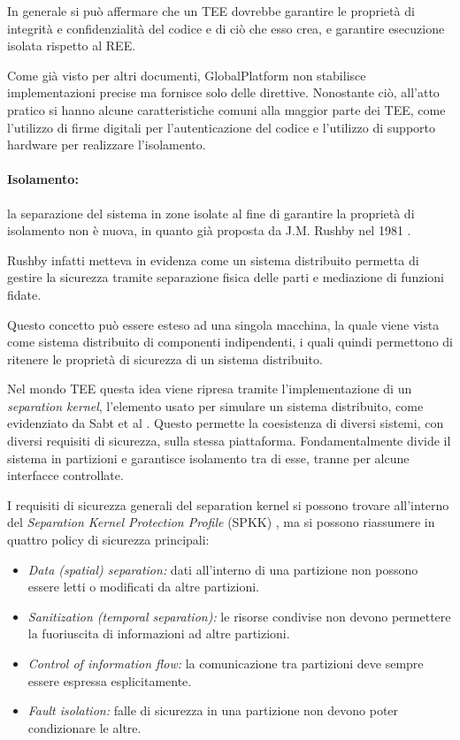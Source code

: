 \documentclass[12pt,italian]{report}
\begin{document}
 	\bigbreak
 	
 	In generale si può affermare che un TEE dovrebbe garantire le proprietà di integrità e confidenzialità del codice e di ciò che esso crea, e garantire esecuzione isolata rispetto al REE.
 	
 	Come già visto per altri documenti, GlobalPlatform non stabilisce implementazioni precise ma fornisce solo delle direttive. Nonostante ciò, all'atto pratico si hanno alcune caratteristiche comuni alla maggior parte dei TEE, come l'utilizzo di firme digitali per l'autenticazione del codice e l'utilizzo di supporto hardware per realizzare l'isolamento.
 	
 	\bigbreak
 	
 	\paragraph{Isolamento:} la separazione del sistema in zone isolate al fine di garantire la proprietà di isolamento non è nuova, in quanto già proposta da J.M. Rushby nel 1981 \cite{rushby1981separationkernel}. 
 	
 	Rushby infatti metteva in evidenza come un sistema distribuito permetta di gestire la sicurezza tramite separazione fisica delle parti e mediazione di funzioni fidate.
 	
 	Questo concetto può essere esteso ad una singola macchina, la quale viene vista come sistema distribuito di componenti indipendenti, i quali quindi permettono di ritenere le proprietà di sicurezza di un sistema distribuito.
 	
 	Nel mondo TEE questa idea viene ripresa tramite l'implementazione di un \textit{separation kernel}, l'elemento usato per simulare un sistema distribuito, come evidenziato da Sabt et al \cite{sabt2015tee}. Questo permette la coesistenza di diversi sistemi, con diversi requisiti di sicurezza, sulla stessa piattaforma. Fondamentalmente divide il sistema in partizioni e garantisce isolamento tra di esse, tranne per alcune interfacce controllate.
 	
 	I requisiti di sicurezza generali del separation kernel si possono trovare all'interno del \textit{Separation Kernel Protection Profile} (SPKK) \cite{spkk2007}, ma si possono riassumere in quattro policy di sicurezza principali: 
 	\begin{itemize}
 		\item \textit{Data (spatial) separation:} dati all'interno di una partizione non possono essere letti o modificati da altre partizioni.
 		\item \textit{Sanitization (temporal separation):} le risorse condivise non devono permettere la fuoriuscita di informazioni ad altre partizioni.
 		\item \textit{Control of information flow:} la comunicazione tra partizioni deve sempre essere espressa esplicitamente.
 		\item \textit{Fault isolation:} falle di sicurezza in una partizione non devono poter condizionare le altre.
 	\end{itemize}
 	
\end{document}
